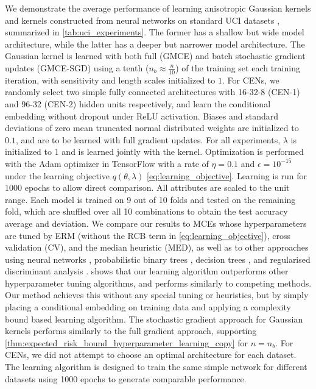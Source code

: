 \documentclass[twoside]{article}
\begin{document}
		We demonstrate the average performance of learning anisotropic Gaussian kernels and kernels constructed from neural networks on standard UCI datasets \citep{bache2013uci}, summarized in \cref{tab:uci_experiments}. The former has a shallow but wide model architecture, while the latter has a deeper but narrower model architecture. The Gaussian kernel is learned with both full (G\gls{MCE}) and batch stochastic gradient updates (G\gls{MCE}-SGD) using a tenth ($n_{b} \approx \frac{n}{10}$) of the training set each training iteration, with sensitivity and length scales initialized to $1$. For \glspl{CEN}, we randomly select two simple fully connected architectures with 16-32-8 (\gls{CEN}-1) and 96-32 (\gls{CEN}-2) hidden units respectively, and learn the conditional embedding without dropout under ReLU activation. Biases and standard deviations of zero mean truncated normal distributed weights are initialized to $0.1$, and are to be learned with full gradient updates. For all experiments, $\lambda$ is initialized to $1$ and is learned jointly with the kernel. Optimization is performed with the Adam optimizer \citep{kingma2014adam} in TensorFlow \citep{abadi2016tensorflow} with a rate of $\eta = 0.1$ and $\epsilon = 10^{-15}$ under the learning objective $q(\theta, \lambda)$ \eqref{eq:learning_objective}. Learning is run for 1000 epochs to allow direct comparison. All attributes are scaled to the unit range. Each model is trained on 9 out of 10 folds and tested on the remaining fold, which are shuffled over all 10 combinations to obtain the test accuracy average and deviation. We compare our results to \glspl{MCE} whose hyperparameters are tuned by \gls{ERM} (without the \gls{RCB} term in \eqref{eq:learning_objective}), cross validation (CV), and the median heuristic (MED), as well as to other approaches using neural networks \citep[a; c]{kaya2016banknote, freire2009short}, probabilistic binary trees \citep[b]{horton1996probabilistic}, decision trees \citep[d]{zhou2004size}, and regularised discriminant analysis \citep[e]{aeberhard1992comparison}.  shows that our learning algorithm outperforms other hyperparameter tuning algorithms, and performs similarly to competing methods. Our method achieves this without any special tuning or heuristics, but by simply placing a conditional embedding on training data and applying a complexity bound based learning algorithm. The stochastic gradient approach for Gaussian kernels performs similarly to the full gradient approach, supporting \cref{thm:expected_risk_bound_hyperparameter_learning_copy} for $n = n_{b}$. For \glspl{CEN}, we did not attempt to choose an optimal architecture for each dataset. The learning algorithm is designed to train the same simple network for different datasets using 1000 epochs to generate comparable performance. 
	
\end{document}

